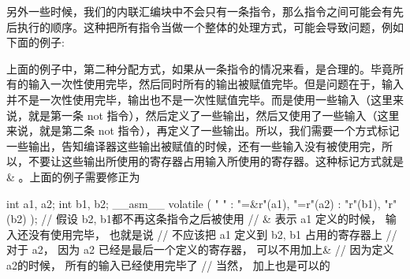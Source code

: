 另外一些时候，我们的内联汇编块中不会只有一条指令，那么指令之间可能会有先后执行的顺序。这种把所有指令当做一个整体的处理方式，可能会导致问题，例如下面的例子:


上面的例子中，第二种分配方式，如果从一条指令的情况来看，是合理的。毕竟所有的输入一次性使用完毕，然后同时所有的输出被赋值完毕。但是问题在于，输入并不是一次性使用完毕，输出也不是一次性赋值完毕。而是使用一些输入（这里来说，就是第一条 not 指令），然后定义了一些输出，然后又使用了一些输入（这里来说，就是第二条 not 指令），再定义了一些输出。所以，我们需要一个方式标记一些输出，告知编译器这些输出被赋值的时候，还有一些输入没有被使用完，所以，不要让这些输出所使用的寄存器占用输入所使用的寄存器。这种标记方式就是\& 。上面的例子需要修正为

\begin{myccode}
int a1, a2;
int b1, b2;
__asm__ volatile (
" %
" %
: "=&r"(a1), "=r"(a2)
: "r"(b1), "r"(b2)
);
// 假设 b2, b1都不再这条指令之后被使用
// & 表示 a1 定义的时候， 输入还没有使用完毕， 也就是说
// 不应该把 a1 定义到 b2, b1 占用的寄存器上
// 对于 a2， 因为 a2 已经是最后一个定义的寄存器， 可以不用加上&
// 因为定义a2的时候， 所有的输入已经使用完毕了
// 当然， 加上也是可以的
\end{myccode}

